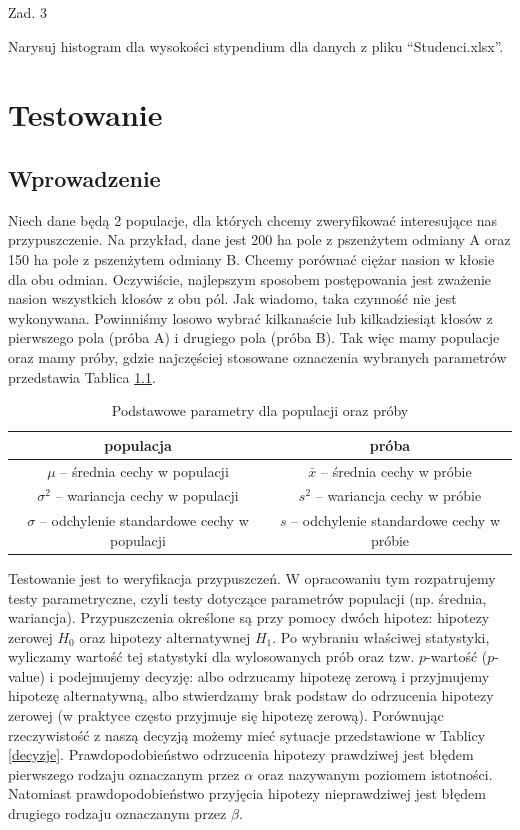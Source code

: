 \documentclass[12pt,B5paper,]{book}
\begin{document}
\vspace{0.8cm} Zad. 3

Narysuj histogram dla wysokości stypendium dla danych z pliku
``Studenci.xlsx''.

\chapter{Testowanie}\label{testowanie}

\section{Wprowadzenie}\label{wprowadzenie}

Niech dane będą 2 populacje, dla których chcemy zweryfikować
interesujące nas przypuszczenie. Na przykład, dane jest 200 ha pole z
pszenżytem odmiany A oraz 150 ha pole z pszenżytem odmiany B. Chcemy
porównać ciężar nasion w kłosie dla obu odmian. Oczywiście, najlepszym
sposobem postępowania jest zważenie nasion wszystkich kłosów z obu pól.
Jak wiadomo, taka czynność nie jest wykonywana. Powinniśmy losowo wybrać
kilkanaście lub kilkadziesiąt kłosów z pierwszego pola (próba A) i
drugiego pola (próba B). Tak więc mamy populacje oraz mamy próby, gdzie
najczęściej stosowane oznaczenia wybranych parametrów przedstawia
Tablica \ref{testowanie}.

\begin{table}[H]
\centering
\caption{Podstawowe parametry dla populacji oraz próby}
\label{testowanie}
\begin{tabular}{cc}
\hline
populacja & próba                                     \\ \hline
$\mu$ – średnia cechy w populacji                & $\bar{x}$ – średnia cechy w próbie               \\
$\sigma^2$ – wariancja cechy w populacji             & $s^2$ – wariancja cechy w próbie             \\
$\sigma$ – odchylenie standardowe cechy w populacji & $s$ – odchylenie standardowe cechy w próbie \\ \hline
\end{tabular}
\end{table}

Testowanie jest to weryfikacja przypuszczeń. W opracowaniu tym
rozpatrujemy testy parametryczne, czyli testy dotyczące parametrów
populacji (np. średnia, wariancja). Przypuszczenia określone są przy
pomocy dwóch hipotez: hipotezy zerowej \(H_0\) oraz hipotezy
alternatywnej \(H_1\). Po wybraniu właściwej statystyki, wyliczamy
wartość tej statystyki dla wylosowanych prób oraz tzw. \(p\)-wartość
(\(p\)-value) i podejmujemy decyzję: albo odrzucamy hipotezę zerową i
przyjmujemy hipotezę alternatywną, albo stwierdzamy brak podstaw do
odrzucenia hipotezy zerowej (w praktyce często przyjmuje się hipotezę
zerową). Porównując rzeczywistość z naszą decyzją możemy mieć sytuacje
przedstawione w Tablicy \ref{decyzje}. Prawdopodobieństwo odrzucenia
hipotezy prawdziwej jest błędem pierwszego rodzaju oznaczanym przez
\(\alpha\) oraz nazywanym poziomem istotności. Natomiast
prawdopodobieństwo przyjęcia hipotezy nieprawdziwej jest błędem drugiego
rodzaju oznaczanym przez \(\beta\).
\end{document}
